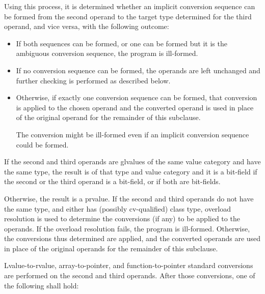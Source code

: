 Using this process, it is determined whether an implicit conversion
sequence can be formed from the second operand
to the target type determined for the third operand, and vice versa,
with the following outcome:
\begin{itemize}
\item If both sequences can be formed, or one can be formed but it is the
ambiguous conversion sequence, the program is ill-formed.
\item If no conversion sequence can be formed, the operands are left unchanged
and further checking is performed as described below.
\item Otherwise, if exactly one conversion sequence can be formed,
that conversion is applied to the chosen operand
and the converted operand is used in place of the original operand for
the remainder of this subclause.
\begin{note}
The conversion might be ill-formed even if an implicit conversion
sequence could be formed.
\end{note}
\end{itemize}

\pnum
If the second and third operands are glvalues of the same value category
and have the same type, the
result is of that type and value category and it is a bit-field if the
second or the third operand is a bit-field, or if both are bit-fields.

\pnum
Otherwise, the result is a prvalue. If the second and third operands do
not have the same type, and either has (possibly cv-qualified) class
type, overload resolution is used to determine the conversions (if any)
to be applied to the operands.
If the overload resolution fails, the program is ill-formed. Otherwise,
the conversions thus determined are applied, and the converted operands
are used in place of the original operands for the remainder of this
subclause.

\pnum
Lvalue-to-rvalue, array-to-pointer,
and function-to-pointer standard conversions are
performed on the second and third operands. After those conversions, one
of the following shall hold:

